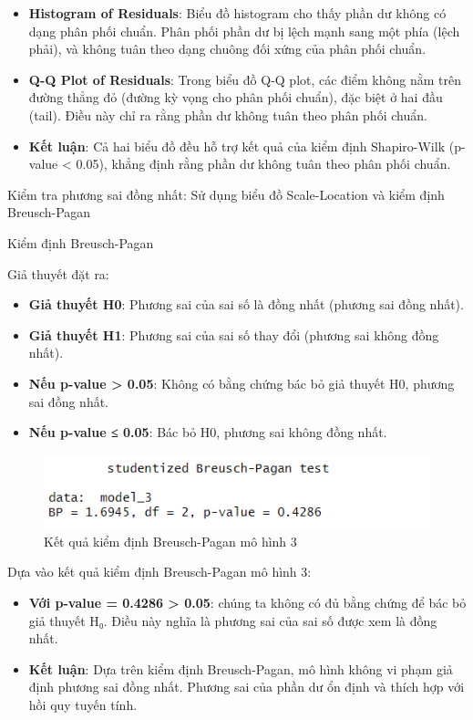 \begin{itemize}
  \item\textbf{Histogram of Residuals}: Biểu đồ histogram cho thấy phần dư không có dạng phân phối chuẩn. Phân phối phần dư bị lệch mạnh sang một phía (lệch phải), và không tuân theo dạng chuông đối xứng của phân phối chuẩn.
  \item\textbf{Q-Q Plot of Residuals}: Trong biểu đồ Q-Q plot, các điểm không nằm trên đường thẳng đỏ (đường kỳ vọng cho phân phối chuẩn), đặc biệt ở hai đầu (tail). Điều này chỉ ra rằng phần dư không tuân theo phân phối chuẩn.
  \item\textbf{Kết luận}: Cả hai biểu đồ đều hỗ trợ kết quả của kiểm định Shapiro-Wilk (p-value < 0.05), khẳng định rằng phần dư không tuân theo phân phối chuẩn.
\end{itemize}

Kiểm tra phương sai đồng nhất: Sử dụng biểu đồ Scale-Location và kiểm định Breusch-Pagan

Kiểm định Breusch-Pagan

Giả thuyết đặt ra:
\begin{itemize}
  \item\textbf{Giả thuyết H0}: Phương sai của sai số là đồng nhất (phương sai đồng nhất).
  \item\textbf{Giả thuyết H1}: Phương sai của sai số thay đổi (phương sai không đồng nhất).
  \item\textbf{Nếu p-value > 0.05}: Không có bằng chứng bác bỏ giả thuyết H0, phương sai đồng nhất.
  \item\textbf{Nếu p-value ≤ 0.05}: Bác bỏ H0, phương sai không đồng nhất.
\end{itemize}

\begin{figure}[!htp]
  \centering
  \includegraphics[width=0.5\linewidth]{graphics/5.5.10.png}
  \caption{Kết quả kiểm định Breusch-Pagan mô hình 3 }
\end{figure}

Dựa vào kết quả kiểm định Breusch-Pagan mô hình 3:
\begin{itemize}
\item\textbf{Với p-value = 0.4286 > 0.05}: chúng ta không có đủ bằng chứng để bác bỏ giả thuyết H₀. Điều này nghĩa là phương sai của sai số được xem là đồng nhất.
\item\textbf{Kết luận}: Dựa trên kiểm định Breusch-Pagan, mô hình không vi phạm giả định phương sai đồng nhất. Phương sai của phần dư ổn định và thích hợp với hồi quy tuyến tính.
\end{itemize}

